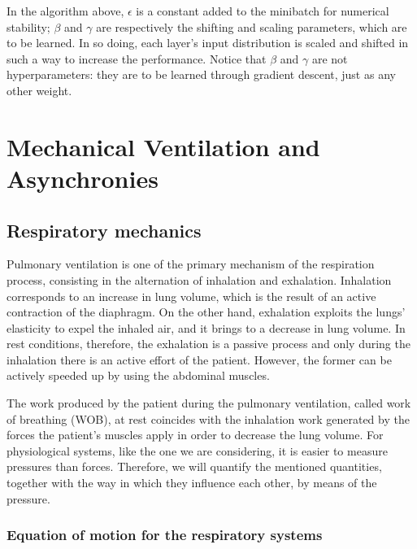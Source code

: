\documentclass[a4paper, twoside]{article}
\begin{document}
        In the algorithm above, $\epsilon$ is a constant added to the minibatch for numerical stability; $\beta$ and $\gamma$ are respectively the shifting and scaling parameters, which are to be learned. In so doing, each layer's input distribution is scaled and shifted in such a way to increase the performance. Notice that $\beta$ and $\gamma$ are not hyperparameters: they are to be learned through gradient descent, just as any other weight.















\newpage

\section{Mechanical Ventilation and Asynchronies}

    \subsection{Respiratory mechanics}

    Pulmonary ventilation is one of the primary mechanism of the respiration process, consisting in the alternation of inhalation and exhalation. Inhalation corresponds to an increase in lung volume, which is the result of an active contraction of the diaphragm. On the other hand, exhalation exploits the lungs' elasticity to expel the inhaled air, and it brings to a decrease in lung volume. In rest conditions, therefore, the exhalation is a passive process and only during the inhalation there is an active effort of the patient. However, the former can be actively speeded up by using the abdominal muscles.

    The work produced by the patient during the pulmonary ventilation, called work of breathing (WOB), at rest coincides with the inhalation work generated by the forces the patient's muscles apply in order to decrease the lung volume. For physiological systems, like the one we are considering, it is easier to measure pressures than forces. Therefore, we will quantify the mentioned quantities, together with the way in which they influence each other, by means of the pressure.

    \subsubsection{Equation of motion for the respiratory systems}
\end{document}
